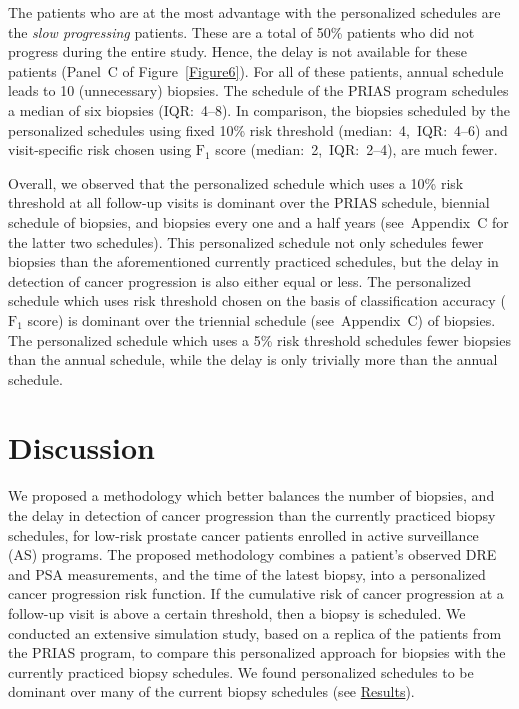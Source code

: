 \documentclass[a4paper, 12pt]{article}
\begin{document}
The patients who are at the most advantage with the personalized schedules are the \textit{slow progressing} patients. These are a total of 50\% patients who did not progress during the entire study. Hence, the delay is not available for these patients (Panel~C of Figure~\ref{Figure6}). For all of these patients, annual schedule leads to 10 (unnecessary) biopsies. The schedule of the PRIAS program schedules a median of six biopsies (IQR:~4--8). In comparison, the biopsies scheduled by the personalized schedules using fixed 10\% risk threshold (median:~4,~IQR:~4--6) and visit-specific risk chosen using $\mbox{F}_1$ score (median:~2,~IQR:~2--4), are much fewer.

Overall, we observed that the personalized schedule which uses a 10\% risk threshold at all follow-up visits is dominant over the PRIAS schedule, biennial schedule of biopsies, and biopsies every one and a half years (see~Appendix~C for the latter two schedules). This personalized schedule not only schedules fewer biopsies than the aforementioned currently practiced schedules, but the delay in detection of cancer progression is also either equal or less. The personalized schedule which uses risk threshold chosen on the basis of classification accuracy ($\mbox{F}_1$ score) is dominant over the triennial schedule (see~Appendix~C) of biopsies. The personalized schedule which uses a 5\% risk threshold schedules fewer biopsies than the annual schedule, while the delay is only trivially more than the annual schedule.

\section{Discussion}
\label{sec:discussion}
We proposed a methodology which better balances the number of biopsies, and the delay in detection of cancer progression than the currently practiced biopsy schedules, for low-risk prostate cancer patients enrolled in active surveillance (AS) programs. The proposed methodology combines a patient's observed DRE and PSA measurements, and the time of the latest biopsy, into a personalized cancer progression risk function. If the cumulative risk of cancer progression at a follow-up visit is above a certain threshold, then a biopsy is scheduled. We conducted an extensive simulation study, based on a replica of the patients from the PRIAS program, to compare this personalized approach for biopsies with the currently practiced biopsy schedules. We found personalized schedules to be dominant over many of the current biopsy schedules (see \hyperref[sec:results]{Results}).
\end{document}
